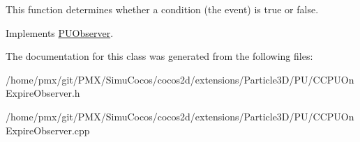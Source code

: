 This function determines whether a condition (the event) is true or false. 

Implements \hyperlink{classPUObserver_a50f59cc3245e291b641463db5d3037f7}{P\+U\+Observer}.



The documentation for this class was generated from the following files\+:\begin{DoxyCompactItemize}
\item 
/home/pmx/git/\+P\+M\+X/\+Simu\+Cocos/cocos2d/extensions/\+Particle3\+D/\+P\+U/C\+C\+P\+U\+On\+Expire\+Observer.\+h\item 
/home/pmx/git/\+P\+M\+X/\+Simu\+Cocos/cocos2d/extensions/\+Particle3\+D/\+P\+U/C\+C\+P\+U\+On\+Expire\+Observer.\+cpp\end{DoxyCompactItemize}
